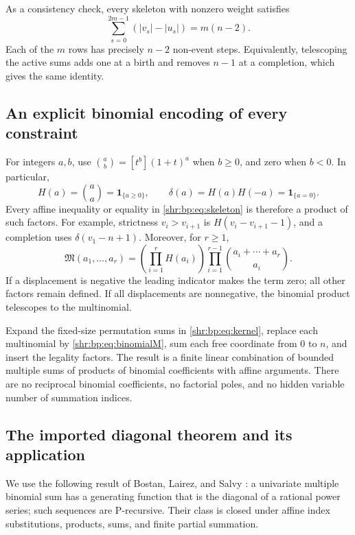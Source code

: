 \documentclass[11pt,letterpaper]{article}
\numberwithin{equation}{section}
\theoremstyle{definition}
\newcommand{\1}{\mathbf 1}
\newcommand{\ind}{\mathbf 1}
\newcommand{\M}{\mathfrak M}
\begin{document}
As a consistency check, every skeleton with nonzero weight satisfies
\begin{equation}
 \sum_{s=0}^{2m-1}(|v_s|-|u_s|)=m(n-2).
 \label{shr:bp:eq:unmarkedsteps}
\end{equation}
Each of the $m$ rows has precisely $n-2$ non-event steps. Equivalently,
telescoping the active sums adds one at a birth and removes $n-1$ at a
completion, which gives the same identity.

\subsection{An explicit binomial encoding of every constraint}
For integers $a,b$, use
$\binom ab=[t^b](1+t)^a$ when $b\ge0$, and zero when $b<0$.
In particular,
\begin{equation}
 H(a)=\binom aa=\ind_{\{a\ge0\}},\qquad
 \delta(a)=H(a)H(-a)=\ind_{\{a=0\}}.
 \label{shr:bp:eq:Hdelta}
\end{equation}
Every affine inequality or equality in \eqref{shr:bp:eq:skeleton} is therefore
a product of such factors. For example, strictness $v_i>v_{i+1}$ is
$H(v_i-v_{i+1}-1)$, and a completion uses $\delta(v_1-n+1)$.
Moreover, for $r\ge1$,
\begin{equation}
 \M(a_1,\ldots,a_r)=
 \left(\prod_{i=1}^r H(a_i)\right)
 \prod_{i=1}^{r-1}\binom{a_i+\cdots+a_r}{a_i}.
 \label{shr:bp:eq:binomialM}
\end{equation}
If a displacement is negative the leading indicator makes the term zero;
all other factors remain defined. If all displacements are nonnegative,
the binomial product telescopes to the multinomial.

Expand the fixed-size permutation sums in \eqref{shr:bp:eq:kernel}, replace each
multinomial by \eqref{shr:bp:eq:binomialM}, sum each free coordinate from $0$ to
$n$, and insert the legality factors. The result is a finite linear
combination of bounded multiple sums of products of binomial coefficients
with affine arguments. There are no reciprocal binomial coefficients,
no factorial poles, and no hidden variable number of summation indices.

\subsection{The imported diagonal theorem and its application}
We use the following result of Bostan, Lairez, and Salvy
\cite[Theorem~3.5 and Corollary~3.6]{BLS}: a univariate multiple binomial
sum has a generating function that is the diagonal of a rational power
series; such sequences are P-recursive. Their class is closed under affine
index substitutions, products, sums, and finite partial summation.
\end{document}
